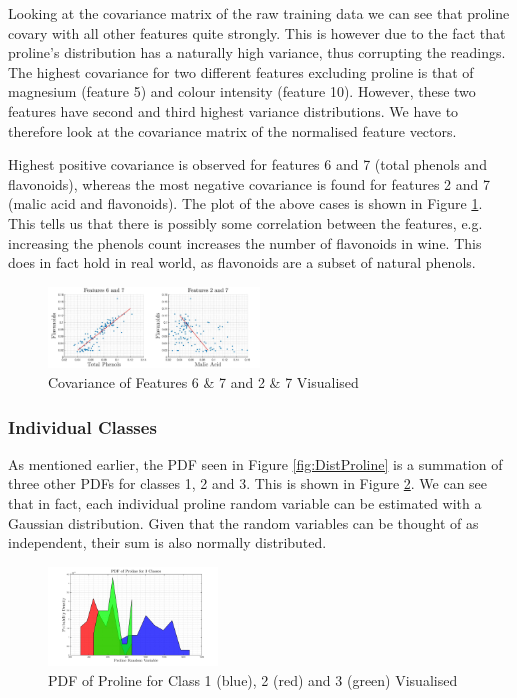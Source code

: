 \documentclass[10pt,twocolumn,letterpaper]{article}
\begin{document}
Looking at the covariance matrix of the raw training data we can see that proline covary with all other features quite strongly. This is however due to the fact that proline's distribution has a naturally high variance, thus corrupting the readings. The highest covariance for two different features excluding proline is that of magnesium (feature 5) and colour intensity (feature 10). However, these two features have second and third highest variance distributions. We have to therefore look at the covariance matrix of the normalised feature vectors.

Highest positive covariance is observed for features 6 and 7 (total phenols and flavonoids), whereas the most negative covariance is found for features 2 and 7 (malic acid and flavonoids). The plot of the above cases is shown in Figure \ref{fig:covAll}. This tells us that there is possibly some correlation between the features, e.g. increasing the phenols count increases the number of flavonoids in wine. This does in fact hold in real world, as flavonoids are a subset of natural phenols.

\begin{figure}[H]
\centering
\includegraphics[width=0.5\textwidth]{../results/Q1_covAll}
\caption{Covariance of Features 6 \& 7 and 2 \& 7 Visualised \label{fig:covAll}}
\end{figure}

\subsubsection{Individual Classes} \label{sec:CovCla}

\indent \indent As mentioned earlier, the PDF seen in Figure \ref{fig:DistProline} is a summation of three other PDFs for classes 1, 2 and 3. This is shown in Figure \ref{fig:DistProline_Idv}. We can see that in fact, each individual proline random variable can be estimated with a Gaussian distribution. Given that the random variables can be thought of as independent, their sum is also normally distributed.

\begin{figure}[H]
\centering
\includegraphics[width=0.4\textwidth]{../results/Q1_ProlineDist_Idv}
\caption{PDF of Proline for Class 1 (blue), 2 (red) and 3 (green) Visualised \label{fig:DistProline_Idv}}
\end{figure}
\end{document}
